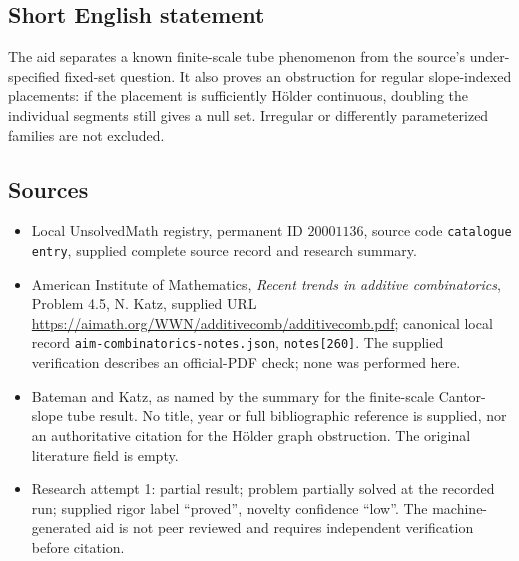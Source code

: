 \documentclass[11pt]{article}
\begin{document}
\subsection{Short English statement}
The aid separates a known finite-scale tube phenomenon from the source's under-specified fixed-set question. It also proves an obstruction for regular slope-indexed placements: if the placement is sufficiently H\"older continuous, doubling the individual segments still gives a null set. Irregular or differently parameterized families are not excluded.
\subsection{Sources}
\begin{itemize}
\item Local UnsolvedMath registry, permanent ID $20001136$, source code \texttt{catalogue entry}, supplied complete source record and research summary.
\item American Institute of Mathematics, \emph{Recent trends in additive combinatorics}, Problem 4.5, N. Katz, supplied URL \url{https://aimath.org/WWN/additivecomb/additivecomb.pdf}; canonical local record \texttt{aim-combinatorics-notes.json}, \texttt{notes[260]}. The supplied verification describes an official-PDF check; none was performed here.
\item Bateman and Katz, as named by the summary for the finite-scale Cantor-slope tube result. No title, year or full bibliographic reference is supplied, nor an authoritative citation for the H\"older graph obstruction. The original literature field is empty.
\item Research attempt 1: partial result; problem partially solved at the recorded run; supplied rigor label ``proved'', novelty confidence ``low''. The machine-generated aid is not peer reviewed and requires independent verification before citation.
\end{itemize}
\end{document}
